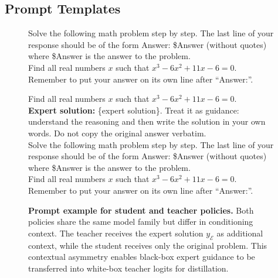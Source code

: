 \documentclass{article}
\begin{document}
\subsection{Prompt Templates}
\label{app:prompts}
\begin{figure}[h]
\centering
\begin{tcolorbox}[
  enhanced,
  colback=studentbg,
  colframe=orange!60!black,
  coltitle=orange!60!black,
  colbacktitle=studentbg,
  title={\textbf{Student Prompt}\quad $\pi_\theta(\cdot \mid x)$},
  fonttitle=\bfseries,
  rounded corners,
  boxrule=1.2pt,
  width=0.95\textwidth
]
\ttfamily\small
Solve the following math problem step by step. The last line of your response should be of the form Answer: \$Answer (without quotes) where \$Answer is the answer to the problem.\\[6pt]
Find all real numbers $x$ such that $x^3 - 6x^2 + 11x - 6 = 0$.\\[4pt]
Remember to put your answer on its own line after ``Answer:''.
\end{tcolorbox}
\vspace{6pt}
\begin{tcolorbox}[
  enhanced,
  colback=teacherbg,
  colframe=green!60!black,
  coltitle=green!60!black,
  colbacktitle=teacherbg,
  title={\textbf{Teacher Prompt}\quad $\pi_{\bar{\theta}}(\cdot \mid x,\; y_{\mathcal{E}})$},
  fonttitle=\bfseries,
  rounded corners,
  boxrule=1.2pt,
  width=0.95\textwidth
]
\ttfamily\small
Find all real numbers $x$ such that $x^3 - 6x^2 + 11x - 6 = 0$.\\[6pt]
\textcolor{green!40!black}{\textbf{Expert solution:}} \{expert solution\}. Treat it as guidance: understand the reasoning and then write the solution in your own words. Do not copy the original answer verbatim.\\[4pt]
Solve the following math problem step by step. The last line of your response should be of the form Answer: \$Answer (without quotes) where \$Answer is the answer to the problem.\\[6pt]
Find all real numbers $x$ such that $x^3 - 6x^2 + 11x - 6 = 0$.\\[4pt]
Remember to put your answer on its own line after ``Answer:''.
\end{tcolorbox}
\caption{\textbf{Prompt example for student and teacher policies.} Both policies share the same model family but differ in conditioning context. The teacher receives the expert solution $y_{\mathcal{E}}$ as additional context, while the student receives only the original problem. This contextual asymmetry enables black-box expert guidance to be transferred into white-box teacher logits for distillation.}
\label{fig:prompts}
\end{figure}
\end{document}
